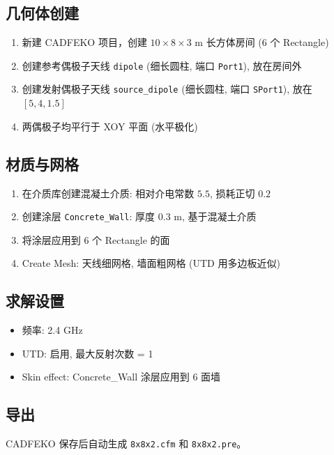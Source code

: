 \documentclass[12pt,a4paper]{ctexart}
\begin{document}
\subsection{几何体创建}

\begin{enumerate}[itemsep=3pt]
    \item 新建 CADFEKO 项目，创建 $10\times8\times3$ m 长方体房间 (6 个 Rectangle)
    \item 创建参考偶极子天线 \texttt{dipole} (细长圆柱, 端口 \texttt{Port1}), 放在房间外
    \item 创建发射偶极子天线 \texttt{source\_dipole} (细长圆柱, 端口 \texttt{SPort1}), 放在 $[5,4,1.5]$
    \item 两偶极子均平行于 XOY 平面 (水平极化)
\end{enumerate}

\subsection{材质与网格}

\begin{enumerate}[itemsep=3pt]
    \item 在介质库创建混凝土介质: 相对介电常数 $5.5$, 损耗正切 $0.2$
    \item 创建涂层 \texttt{Concrete\_Wall}: 厚度 0.3 m, 基于混凝土介质
    \item 将涂层应用到 6 个 Rectangle 的面
    \item Create Mesh: 天线细网格, 墙面粗网格 (UTD 用多边板近似)
\end{enumerate}

\subsection{求解设置}

\begin{itemize}
    \item 频率: 2.4 GHz
    \item UTD: 启用, 最大反射次数 = 1
    \item Skin effect: Concrete\_Wall 涂层应用到 6 面墙
\end{itemize}

\subsection{导出}

CADFEKO 保存后自动生成 \texttt{8x8x2.cfm} 和 \texttt{8x8x2.pre}。
\end{document}
